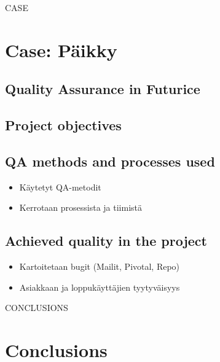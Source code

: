 \documentclass[12pt,a4paper,finnish]{tutthesis}
\begin{document}
 
	CASE

 \chapter{Case: Päikky}
 
 \section{Quality Assurance in Futurice}

 \section{Project objectives}

 \section{QA methods and processes used}
 
 \begin{itemize}
 
 \item Käytetyt QA-metodit
 \item Kerrotaan prosessista ja tiimistä
 
 \end{itemize}
 
 \section{Achieved quality in the project}

 \begin{itemize}
 
 \item Kartoitetaan bugit (Mailit, Pivotal, Repo)  
 \item Asiakkaan ja loppukäyttäjien tyytyväisyys
 
 \end{itemize}
 
	CONCLUSIONS

 \chapter{Conclusions}
 
\end{document}
